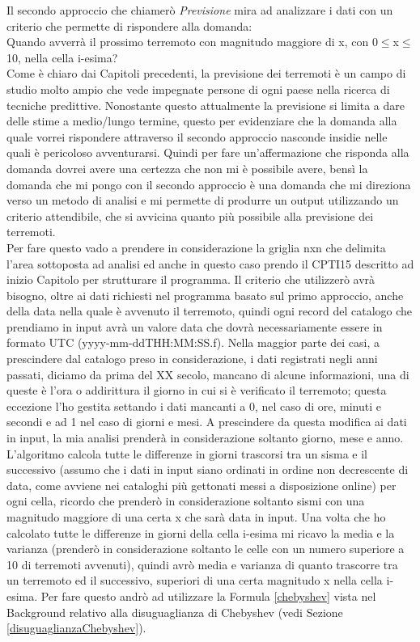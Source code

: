 Il secondo approccio che chiamer\`o \textit{Previsione} mira ad analizzare i dati con un criterio che permette di rispondere alla domanda:\\
Quando avverr\`a il prossimo terremoto con magnitudo maggiore di x, con 0$\le$x$\le$10, nella cella i-esima?\\
Come \`e chiaro dai Capitoli precedenti, la previsione dei terremoti \`e un campo di studio molto ampio che vede impegnate persone di ogni paese nella ricerca di tecniche predittive. Nonostante questo attualmente la previsione si limita a dare delle stime a medio/lungo termine, questo per evidenziare che la domanda alla quale vorrei rispondere attraverso il secondo approccio nasconde insidie nelle quali \`e pericoloso avventurarsi. Quindi per fare un'affermazione che risponda alla domanda dovrei avere una certezza che non mi \`e possibile avere, bens\`i la domanda che mi pongo con il secondo approccio \`e una domanda che mi direziona verso un metodo di analisi e mi permette di produrre un output utilizzando un criterio attendibile, che si avvicina quanto pi\`u possibile alla previsione dei terremoti.\\
Per fare questo vado a prendere in considerazione la griglia nxn che delimita l'area sottoposta ad analisi ed anche in questo caso prendo il CPTI15 descritto ad inizio Capitolo per strutturare il programma. Il criterio che utilizzer\`o avr\`a bisogno, oltre ai dati richiesti nel programma basato sul primo approccio, anche della data nella quale \`e avvenuto il terremoto, quindi ogni record del catalogo che prendiamo in input avr\`a un valore data che dovr\`a necessariamente essere in formato UTC (yyyy-mm-ddTHH:MM:SS.f). Nella maggior parte dei casi, a prescindere dal catalogo preso in considerazione, i dati registrati negli anni passati, diciamo da prima del XX secolo, mancano di alcune informazioni, una di queste \`e l'ora o addirittura il giorno in cui si \`e verificato il terremoto; questa eccezione l'ho gestita settando i dati mancanti a 0, nel caso di ore, minuti e secondi e ad 1 nel caso di giorni e mesi. A prescindere da questa modifica ai dati in input, la mia analisi prender\`a in considerazione soltanto giorno, mese e anno.\\
L'algoritmo calcola tutte le differenze in giorni trascorsi tra un sisma e il successivo (assumo che i dati in input siano ordinati in ordine non decrescente di data, come avviene nei cataloghi pi\`u gettonati messi a disposizione online) per ogni cella, ricordo che prender\`o in considerazione soltanto sismi con una magnitudo maggiore di una certa x che sar\`a data in input. Una volta che ho calcolato tutte le differenze in giorni della cella i-esima mi ricavo la media e la varianza (prender\`o in considerazione soltanto le celle con un numero superiore a 10 di terremoti avvenuti), quindi avr\`o media e varianza di quanto trascorre tra un terremoto ed il successivo, superiori di una certa magnitudo x nella cella i-esima. Per fare questo andr\`o ad utilizzare la Formula \ref{chebyshev} vista nel Background relativo alla disuguaglianza di Chebyshev (vedi Sezione \ref{disuguaglianzaChebyshev}).
